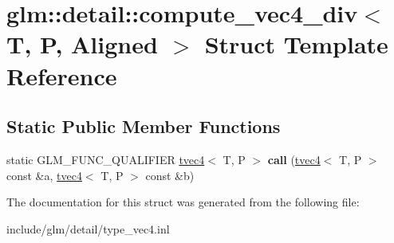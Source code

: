 \hypertarget{structglm_1_1detail_1_1compute__vec4__div}{}\section{glm\+:\+:detail\+:\+:compute\+\_\+vec4\+\_\+div$<$ T, P, Aligned $>$ Struct Template Reference}
\label{structglm_1_1detail_1_1compute__vec4__div}
\subsection*{Static Public Member Functions}
\begin{DoxyCompactItemize}
\item 
\mbox{\label{structglm_1_1detail_1_1compute__vec4__div_aad8aa773a84ae85242106b29186eab7a}} 
static G\+L\+M\+\_\+\+F\+U\+N\+C\+\_\+\+Q\+U\+A\+L\+I\+F\+I\+ER \hyperlink{structglm_1_1tvec4}{tvec4}$<$ T, P $>$ {\bfseries call} (\hyperlink{structglm_1_1tvec4}{tvec4}$<$ T, P $>$ const \&a, \hyperlink{structglm_1_1tvec4}{tvec4}$<$ T, P $>$ const \&b)
\end{DoxyCompactItemize}


The documentation for this struct was generated from the following file\+:\begin{DoxyCompactItemize}
\item 
include/glm/detail/type\+\_\+vec4.\+inl\end{DoxyCompactItemize}
